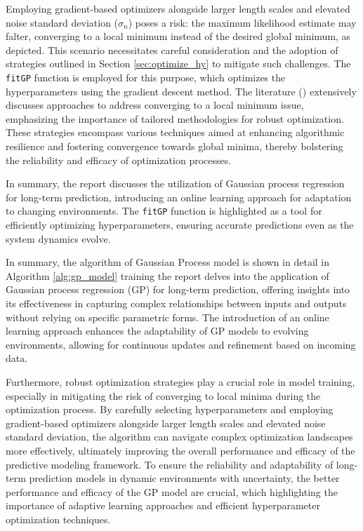 Employing gradient-based optimizers alongside larger length scales and elevated noise standard deviation ($\sigma_n$) poses a risk: the maximum likelihood estimate may falter, converging to a local minimum instead of the desired global minimum, as depicted. This scenario necessitates careful consideration and the adoption of strategies outlined in Section \ref{sec:optimize_hy} to mitigate such challenges. The \texttt{fitGP} function is employed for this purpose, which optimizes the hyperparameters using the gradient descent method. The literature (\cite{LUBSEN20233079}) extensively discusses approaches to address converging to a local minimum issue, emphasizing the importance of tailored methodologies for robust optimization. These strategies encompass various techniques aimed at enhancing algorithmic resilience and fostering convergence towards global minima, thereby bolstering the reliability and efficacy of optimization processes.

In summary, the report discusses the utilization of Gaussian process regression for long-term prediction, introducing an online learning approach for adaptation to changing environments. The \texttt{fitGP} function is highlighted as a tool for efficiently optimizing hyperparameters, ensuring accurate predictions even as the system dynamics evolve.

In summary, the algorithm of Gaussian Process model is shown in detail in Algorithm \ref{alg:gp_model} training the report delves into the application of Gaussian process regression (GP) for long-term prediction, offering insights into its effectiveness in capturing complex relationships between inputs and outputs without relying on specific parametric forms. The introduction of an online learning approach enhances the adaptability of GP models to evolving environments, allowing for continuous updates and refinement based on incoming data.

Furthermore, robust optimization strategies play a crucial role in model training, especially in mitigating the risk of converging to local minima during the optimization process. By carefully selecting hyperparameters and employing gradient-based optimizers alongside larger length scales and elevated noise standard deviation, the algorithm can navigate complex optimization landscapes more effectively, ultimately improving the overall performance and efficacy of the predictive modeling framework. To ensure the reliability and adaptability of long-term prediction models in dynamic environments with uncertainty, the better performance and efficacy of the GP model are crucial, which highlighting the importance of adaptive learning approaches and efficient hyperparameter optimization techniques.

